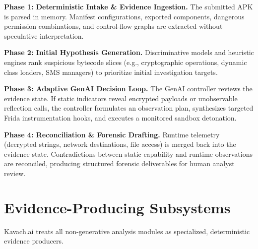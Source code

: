 \documentclass[conference]{IEEEtran}
\begin{document}
\textbf{Phase 1: Deterministic Intake \& Evidence Ingestion.} The submitted APK is parsed in memory. Manifest configurations, exported components, dangerous permission combinations, and control-flow graphs are extracted without speculative interpretation.

\textbf{Phase 2: Initial Hypothesis Generation.} Discriminative models and heuristic engines rank suspicious bytecode slices (e.g., cryptographic operations, dynamic class loaders, SMS managers) to prioritize initial investigation targets.

\textbf{Phase 3: Adaptive GenAI Decision Loop.} The GenAI controller reviews the evidence state. If static indicators reveal encrypted payloads or unobservable reflection calls, the controller formulates an observation plan, synthesizes targeted Frida instrumentation hooks, and executes a monitored sandbox detonation.

\textbf{Phase 4: Reconciliation \& Forensic Drafting.} Runtime telemetry (decrypted strings, network destinations, file access) is merged back into the evidence state. Contradictions between static capability and runtime observations are reconciled, producing structured forensic deliverables for human analyst review.

\section{Evidence-Producing Subsystems}
Kavach.ai treats all non-generative analysis modules as specialized, deterministic evidence producers.
\end{document}
